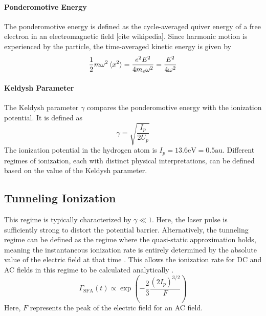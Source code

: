 \paragraph{Ponderomotive Energy}
The ponderomotive energy is defined as the cycle-averaged quiver energy of a free electron in an electromagnetic field [cite wikipedia].
Since harmonic motion is experienced by the particle, the time-averaged kinetic energy is given by
\begin{equation*}
    \frac{1}{2}m\omega^2 \braket{x^2}=\frac{e^2E^2}{4m_e\omega^2} = \frac{E^2}{4\omega^2}
\end{equation*}

\paragraph{Keldysh Parameter}
The Keldysh parameter $\gamma$ compares the ponderomotive energy with the ionization potential.
It is defined as
\begin{equation*}
    \gamma = \sqrt{\frac{I_p}{2U_p}}
\end{equation*}
The ionization potential in the hydrogen atom is $I_p = 13.6\mathrm{eV} = 0.5 \mathrm{au.}$
Different regimes of ionization, each with distinct physical interpretations, can be defined based on the value of the Keldysh parameter.

\subsection{Tunneling Ionization}
This regime is typically characterized by $\gamma \ll 1$.
Here, the laser pulse is sufficiently strong to distort the potential barrier.
Alternatively, the tunneling regime can be defined as the regime where the quasi-static approximation holds, meaning the instantaneous ionization rate is entirely determined by the absolute value of the electric field at that time \cite{manorammasterthesis}.
This allows the ionization rate for DC and AC fields in this regime to be calculated analytically \cite{tunnel_ion_complexatoms}.
\begin{equation*}
    \Gamma_{\mathrm{SFA}}(t) \propto \exp\left(-\frac{2}{3}\frac{(2I_p)^{3/2}}{F}\right)
\end{equation*}
Here, $F$ represents the peak of the electric field for an AC field.

